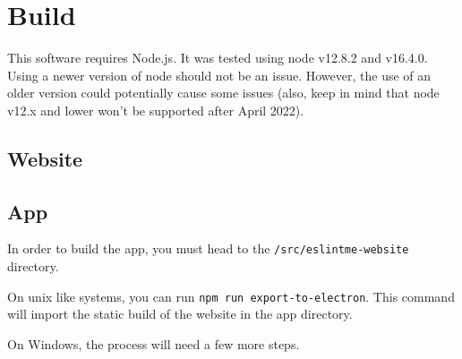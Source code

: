 \section{Build}
This software requires Node.js. It was tested using node v12.8.2 and v16.4.0. 
Using a newer version of node should not be an issue. 
However, the use of an older version could potentially cause some issues 
(also, keep in mind that node v12.x and lower won't be supported after April 2022). 
\subsection{Website}
\subsection{App}

In order to build the app, you must head to the 
\verb|/src/eslintme-website| directory.

On unix like systems, you can run \verb|npm run export-to-electron|. 
This command will import the static build of the website in the app directory.

On Windows, the process will need a few more steps.